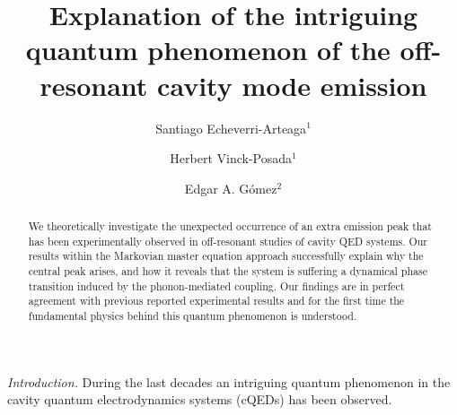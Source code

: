 \documentclass[aps,prl,showpacs,twocolumn]{revtex4}
\begin{document}
\title{Explanation of the intriguing quantum phenomenon of the off-resonant cavity mode emission}
%
\author{Santiago Echeverri-Arteaga$^{1}$}
\author{Herbert Vinck-Posada$^{1}$}
%
\author{Edgar A. G\'omez$^{2}$}
%
\begin{abstract}
We theoretically investigate the unexpected occurrence of an extra emission peak that has been experimentally observed in off-resonant studies of cavity QED systems. Our results within the Markovian master equation approach successfully explain why the central peak arises, and how it reveals that the system is suffering a dynamical phase transition induced by the phonon-mediated coupling. Our findings are in perfect agreement with previous reported experimental results and for the first time the fundamental physics behind this quantum phenomenon is understood.
\end{abstract}
%
%
\maketitle
%
%
\textit{Introduction.}\textendash
During the last decades an intriguing quantum phenomenon in the cavity quantum electrodynamics systems (cQEDs) has been observed.
\end{document}
